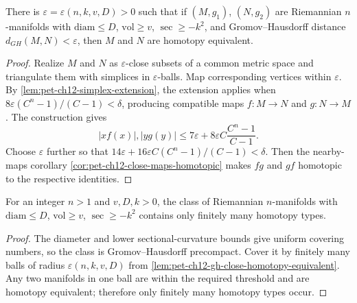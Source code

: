 \begin{lemma}
  \label{lem:pet-ch12-gh-close-homotopy-equivalent}
  There is $\varepsilon=\varepsilon(n,k,v,D)>0$ such that if $(M,g_1)$,
  $(N,g_2)$ are Riemannian $n$-manifolds with $\mathrm{diam}\le D$,
  $\mathrm{vol}\ge v$, $\sec\ge-k^2$, and Gromov--Hausdorff distance
  $d_{GH}(M,N)<\varepsilon$, then $M$ and $N$ are homotopy equivalent.
\end{lemma}
\begin{proof}
  \sketch
  Realize \(M\) and \(N\) as \(\varepsilon\)-close subsets of a common metric
  space and triangulate them with simplices in \(\varepsilon\)-balls. Map
  corresponding vertices within \(\varepsilon\). By
  \cref{lem:pet-ch12-simplex-extension}, the extension applies when
  \(8\varepsilon(C^n-1)/(C-1)<\delta\), producing compatible maps
  \(f:M\to N\) and \(g:N\to M\). The construction gives
  \[|xf(x)|,|yg(y)|\le7\varepsilon+8\varepsilon C\frac{C^n-1}{C-1}.\]
  Choose \(\varepsilon\) further so that
  \(14\varepsilon+16\varepsilon C(C^n-1)/(C-1)<\delta\). Then the nearby-maps
  corollary \cref{cor:pet-ch12-close-maps-homotopic} makes \(f g\) and
  \(g f\) homotopic to the respective identities.
\end{proof}

\begin{theorem}
  \label{thm:pet-ch12-homotopy-finiteness}
  For an integer $n>1$ and $v,D,k>0$, the class of Riemannian $n$-manifolds with
  $\mathrm{diam}\le D$, $\mathrm{vol}\ge v$, $\sec\ge-k^2$ contains only finitely
  many homotopy types.
\end{theorem}
\begin{proof}
  \sketch
  The diameter and lower sectional-curvature bounds give uniform covering
  numbers, so the class is Gromov--Hausdorff precompact. Cover it by finitely
  many balls of radius \(\varepsilon(n,k,v,D)\) from
  \cref{lem:pet-ch12-gh-close-homotopy-equivalent}. Any two manifolds in one
  ball are within the required threshold and are
  homotopy equivalent; therefore only finitely many homotopy types occur.
\end{proof}

